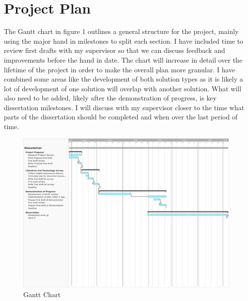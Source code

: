 \documentclass{article}
\begin{document}
\section{Project Plan}
The Gantt chart in figure 1 outlines a general structure for the project, mainly using the major hand in milestones to split each section. I have included time to review first drafts with my supervisor so that we can discuss feedback and improvements before the hand in date. The chart will increase in detail over the lifetime of the project in order to make the overall plan more granular. I have combined some areas like the development of both solution types as it is likely a lot of development of one solution will overlap with another solution. What will also need to be added, likely after the demonstration of progress, is key dissertation milestones. I will discuss with my supervisor closer to the time what parts of the dissertation should be completed and when over the last period of time.
\\
\begin{figure}[h]
    
    \includegraphics[width=\textwidth]{Gantt_Chart.png}
    \caption{Gantt Chart}
\end{figure}
\\
\end{document}
